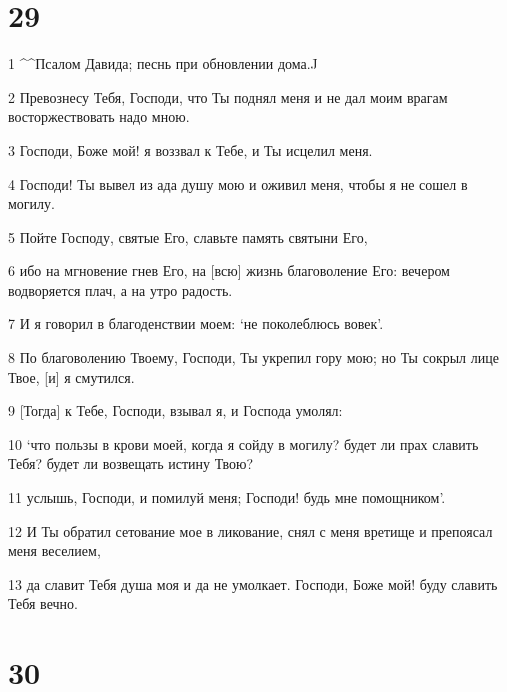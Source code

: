 \chapter{29}

\par 1 ^^Псалом Давида; песнь при обновлении дома.^^
\par 2 Превознесу Тебя, Господи, что Ты поднял меня и не дал моим врагам восторжествовать надо мною.
\par 3 Господи, Боже мой! я воззвал к Тебе, и Ты исцелил меня.
\par 4 Господи! Ты вывел из ада душу мою и оживил меня, чтобы я не сошел в могилу.
\par 5 Пойте Господу, святые Его, славьте память святыни Его,
\par 6 ибо на мгновение гнев Его, на [всю] жизнь благоволение Его: вечером водворяется плач, а на утро радость.
\par 7 И я говорил в благоденствии моем: `не поколеблюсь вовек'.
\par 8 По благоволению Твоему, Господи, Ты укрепил гору мою; но Ты сокрыл лице Твое, [и] я смутился.
\par 9 [Тогда] к Тебе, Господи, взывал я, и Господа умолял:
\par 10 `что пользы в крови моей, когда я сойду в могилу? будет ли прах славить Тебя? будет ли возвещать истину Твою?
\par 11 услышь, Господи, и помилуй меня; Господи! будь мне помощником'.
\par 12 И Ты обратил сетование мое в ликование, снял с меня вретище и препоясал меня веселием,
\par 13 да славит Тебя душа моя и да не умолкает. Господи, Боже мой! буду славить Тебя вечно.

\chapter{30}

